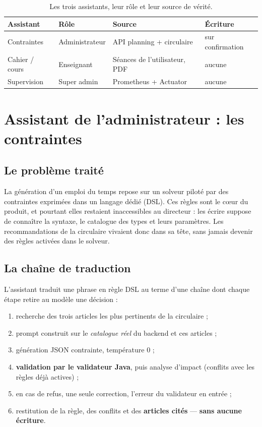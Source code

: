 \begin{table}[htbp]
  \centering\small
  \caption{Les trois assistants, leur rôle et leur source de vérité.}
  \label{tab:ch4-assistants}
  \begin{tabular}{@{}llll@{}}
    \toprule
    \textbf{Assistant} & \textbf{Rôle} & \textbf{Source} & \textbf{Écriture} \\
    \midrule
    Contraintes    & Administrateur & API planning + circulaire & sur confirmation \\
    Cahier / cours & Enseignant     & Séances de l'utilisateur, PDF & aucune \\
    Supervision    & Super admin    & Prometheus + Actuator & aucune \\
    \bottomrule
  \end{tabular}
\end{table}

\section{Assistant de l'administrateur : les contraintes}

\subsection{Le problème traité}

La génération d'un emploi du temps repose sur un solveur piloté par des
contraintes exprimées dans un langage dédié (DSL). Ces règles sont le
c\oe{}ur du produit, et pourtant elles restaient inaccessibles au directeur :
les écrire suppose de connaître la syntaxe, le catalogue des types et leurs
paramètres. Les recommandations de la circulaire vivaient donc dans sa tête,
sans jamais devenir des règles activées dans le solveur.

\subsection{La chaîne de traduction}

L'assistant traduit une phrase en règle DSL au terme d'une chaîne dont chaque
étape retire au modèle une décision :

\begin{enumerate}\itemsep1pt \parskip0pt
  \item recherche des trois articles les plus pertinents de la circulaire ;
  \item prompt construit sur le \emph{catalogue réel} du backend et ces articles ;
  \item génération JSON contrainte, température 0 ;
  \item \textbf{validation par le validateur Java}, puis analyse d'impact
        (conflits avec les règles déjà actives) ;
  \item en cas de refus, une seule correction, l'erreur du validateur en entrée ;
  \item restitution de la règle, des conflits et des \textbf{articles cités} —
        \textbf{sans aucune écriture}.
\end{enumerate}

